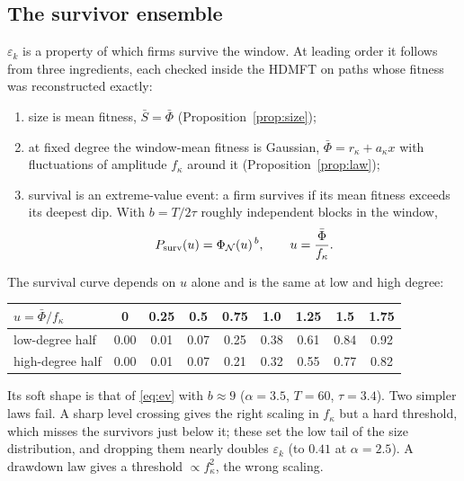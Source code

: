\documentclass[11pt]{article}
\newcommand{\PhiN}{\Phi_{\mathcal N}}
\newcommand{\bPhi}{\bar\Phi}
\begin{document}
\subsection{The survivor ensemble}
\label{sec:ensemble}

$\varepsilon_k$ is a property of which firms survive the window.  At leading order it follows
from three ingredients, each checked inside the HDMFT on paths whose fitness was reconstructed
exactly:
\begin{enumerate}
  \item size is mean fitness, $\bar S=\bPhi$ (Proposition~\ref{prop:size});
  \item at fixed degree the window-mean fitness is Gaussian, $\bPhi=r_\kappa+a_\kappa x$ with
        fluctuations of amplitude $f_\kappa$ around it (Proposition~\ref{prop:law});
  \item survival is an extreme-value event: a firm survives if its mean fitness exceeds its
        deepest dip.  With $b=T/2\tau$ roughly independent blocks in the window,
        \begin{equation}
          P_{\rm surv}(u)=\PhiN(u)^{\,b},\qquad u=\frac{\bPhi}{f_\kappa}.
          \label{eq:ev}
        \end{equation}
\end{enumerate}
The survival curve depends on $u$ alone and is the same at low and high degree:

\begin{center}\small
\begin{tabular}{lcccccccc}
\toprule
$u=\bPhi/f_\kappa$ & 0 & 0.25 & 0.5 & 0.75 & 1.0 & 1.25 & 1.5 & 1.75\\
\midrule
low-degree half  & 0.00 & 0.01 & 0.07 & 0.25 & 0.38 & 0.61 & 0.84 & 0.92\\
high-degree half & 0.00 & 0.01 & 0.07 & 0.21 & 0.32 & 0.55 & 0.77 & 0.82\\
\bottomrule
\end{tabular}
\end{center}

\noindent Its soft shape is that of \eqref{eq:ev} with $b\approx9$ ($\alpha=3.5$, $T=60$, $\tau=3.4$).
Two simpler laws fail.  A sharp level crossing gives the right scaling in $f_\kappa$ but a hard
threshold, which misses the survivors just below it; these set the low tail of the size
distribution, and dropping them nearly doubles $\varepsilon_k$ (to $0.41$ at $\alpha=2.5$).  A drawdown law gives a threshold
$\propto f_\kappa^2$, the wrong scaling.
\end{document}

